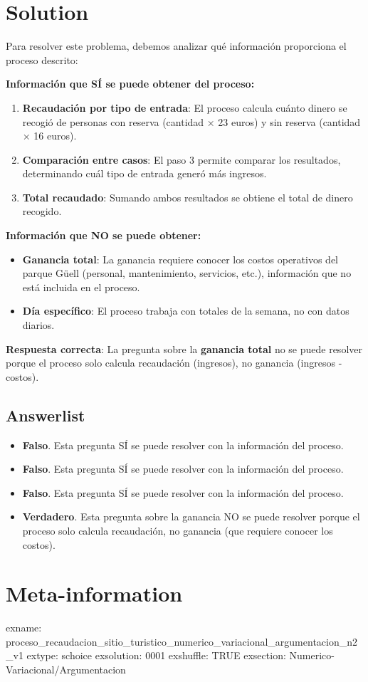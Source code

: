 \documentclass[
]{article}
\providecommand{\tightlist}{%
  \setlength{\itemsep}{0pt}\setlength{\parskip}{0pt}}
\begin{document}
\section{Solution}\label{solution}

Para resolver este problema, debemos analizar qué información
proporciona el proceso descrito:

\textbf{Información que SÍ se puede obtener del proceso:}

\begin{enumerate}
\def\labelenumi{\arabic{enumi}.}
\item
  \textbf{Recaudación por tipo de entrada}: El proceso calcula cuánto
  dinero se recogió de personas con reserva (cantidad × 23 euros) y sin
  reserva (cantidad × 16 euros).
\item
  \textbf{Comparación entre casos}: El paso 3 permite comparar los
  resultados, determinando cuál tipo de entrada generó más ingresos.
\item
  \textbf{Total recaudado}: Sumando ambos resultados se obtiene el total
  de dinero recogido.
\end{enumerate}

\textbf{Información que NO se puede obtener:}

\begin{itemize}
\item
  \textbf{Ganancia total}: La ganancia requiere conocer los costos
  operativos del parque Güell (personal, mantenimiento, servicios,
  etc.), información que no está incluida en el proceso.
\item
  \textbf{Día específico}: El proceso trabaja con totales de la semana,
  no con datos diarios.
\end{itemize}

\textbf{Respuesta correcta}: La pregunta sobre la \textbf{ganancia
total} no se puede resolver porque el proceso solo calcula recaudación
(ingresos), no ganancia (ingresos - costos).

\subsection{Answerlist}\label{answerlist-1}

\begin{itemize}
\tightlist
\item
  \textbf{Falso}. Esta pregunta SÍ se puede resolver con la información
  del proceso.
\item
  \textbf{Falso}. Esta pregunta SÍ se puede resolver con la información
  del proceso.
\item
  \textbf{Falso}. Esta pregunta SÍ se puede resolver con la información
  del proceso.
\item
  \textbf{Verdadero}. Esta pregunta sobre la ganancia NO se puede
  resolver porque el proceso solo calcula recaudación, no ganancia (que
  requiere conocer los costos).
\end{itemize}

\section{Meta-information}\label{meta-information}

exname:
proceso\_recaudacion\_sitio\_turistico\_numerico\_variacional\_argumentacion\_n2\_v1
extype: schoice exsolution: 0001 exshuffle: TRUE exsection:
Numerico-Variacional/Argumentacion
\end{document}
